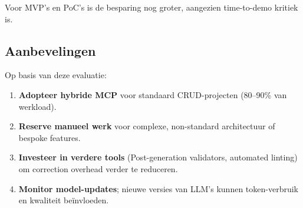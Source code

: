 Voor MVP's en PoC's is de besparing nog groter, aangezien time-to-demo kritiek is.

\subsection{Aanbevelingen}

Op basis van deze evaluatie:

\begin{enumerate}
  \item \textbf{Adopteer hybride MCP} voor standaard CRUD-projecten (80--90\% van werkload).
  
  \item \textbf{Reserve manueel werk} voor complexe, non-standard architectuur of bespoke features.
  
  \item \textbf{Investeer in verdere tools} (Post-generation validators, automated linting) om correction overhead verder te reduceren.
  
  \item \textbf{Monitor model-updates}; nieuwe versies van LLM's kunnen token-verbruik en kwaliteit beïnvloeden.
\end{enumerate}